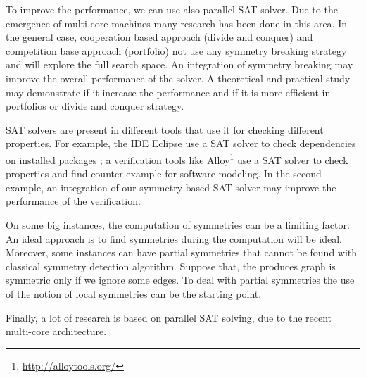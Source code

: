 To improve the performance, we can use also parallel SAT solver. Due to the emergence of multi-core machines
many research has been done in this area. In the general case, cooperation based approach (divide and conquer) and
competition base approach (portfolio)  not use any symmetry breaking strategy and will explore the full search space.
An integration of symmetry breaking may improve the overall performance of the solver.
A theoretical and practical study may demonstrate if it increase the performance and if it is more efficient in 
portfolios or divide and conquer strategy.


SAT solvers are present in different tools that use it for checking different properties. For example, 
the IDE Eclipse use a SAT solver to check dependencies on installed packages \cite{le2008sat};
a verification tools like Alloy\footnote{\url{http://alloytools.org/}} use a SAT solver to check properties and find
counter-example for software modeling. In the second example, an integration of our symmetry based SAT solver may improve the performance of the verification.


On some big instances, the computation of symmetries can be a limiting factor. An ideal approach is to find 
symmetries during the computation will be ideal. Moreover, some instances can have partial symmetries that cannot be 
found with classical symmetry detection algorithm. Suppose that, the produces graph is symmetric only if we ignore some 
edges. To deal with partial symmetries the use of the notion of local symmetries can be the starting point.


Finally, a lot of research is based on parallel SAT solving, due to the recent multi-core architecture. 

